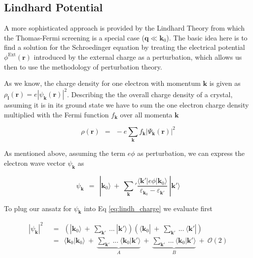 \documentclass[10pt]{report}
\numberwithin{equation}{chapter}
\newcommand{\refEq}[1]{
  Eq  \ref{#1}
}
\newcommand{\OO}{ %
  \mathcal{O}
}
\begin{document}
\subsection{Lindhard Potential}

A more sophisticated approach is provided by the Lindhard Theory from which the Thomas-Fermi screening is a special case ($\mathbf{q} \ll \mathbf{k}_0$). The basic idea here is to find a solution for the Schroedinger equation by treating the electrical potential $\phi^\text{Ext}(\mathbf{r})$ introduced by the external charge as a perturbation, which allows us then to use the methodology of perturbation theory.

As we know, the charge density for one electron with momentum $\mathbf{k}$ is given as $\rho_\mathbf{l}(\mathbf{r}) = e|\psi_\mathbf{k}(\mathbf{r})|^2$. Describing the the overall charge density of a crystal, assuming it is in its ground state we have to sum the one electron charge density multiplied with the Fermi function $f_\mathbf{k}$ over all momenta $\mathbf{k}$

\begin{equation} \label{eq:lindh_charge}
  \rho(\mathbf{r}) ~~=~~ -e \sum_\mathbf{k} f_\mathbf{k} | \Psi_\mathbf{k}(\mathbf{r}) |^2
\end{equation}


As mentioned above, assuming the term $e\phi$ as perturbation, we can express the electron wave vector $\psi_\mathbf{k}$ as 

\begin{equation} \label{eq:lindh_wf}
  \psi_\mathbf{k} ~~=~~ | \mathbf{k}_0 \rangle ~+~ \sum_\mathbf{k}' \frac{\langle \mathbf{k}' | e\phi | \mathbf{k}_0 \rangle}{\varepsilon_{\mathbf{k}_0} - \varepsilon_{\mathbf{k}'}}\ | \mathbf{k}' \rangle
\end{equation}


To plug our ansatz for $\psi_\mathbf{k}$ into \refEq{eq:lindh_charge} we evaluate first

\begin{align} \label{eq:lindh_wf_squared}
  | \psi_\mathbf{k} |^2 ~~& =~~ \left( |\mathbf{k}_0 \rangle ~+~ \sum_{\mathbf{k}'}\ ...\ |\mathbf{k}' \rangle \right) \left( \langle \mathbf{k}_0 | ~+~ \sum_{\mathbf{k}'}\ ...\ \langle \mathbf{k}' | \right) \nonumber \\
  ~~& =~~ \langle \mathbf{k}_0 | \mathbf{k}_0 \rangle ~+~ 
  \underbrace{\sum_{\mathbf{k}'}\ ...\ \langle \mathbf{k}_0 | \mathbf{k}' \rangle}_{A} ~+~ 
  \underbrace{\sum_{\mathbf{k}'}\ ...\ \langle \mathbf{k}_0 | \mathbf{k}' \rangle}_{B} ~+~ \OO(2)
\end{align}
\end{document}
